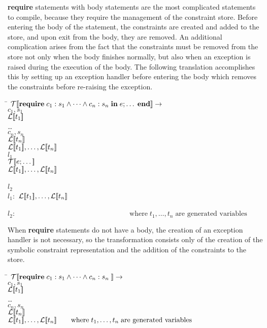 %
{\bf require} statements with body statements are the most complicated
statements to compile, because they require the management of the
constraint store.  Before entering the body of the statement, the
constraints are created and added to the store, and upon exit from the
body, they are removed.  An additional complication arises from the
fact that the constraints must be removed from the store not only when
the body finishes normally, but also when an exception is raised
during the execution of the body.  The following translation
accomplishes this by setting up an exception handler before entering
the body which removes the constraints before re-raising the
exception.

\begin{tabbing}
\qquad \= \quad \kill
${\mathcal{T}{\normalfont [\![} \text{\bf require}\; c_1:s_1\wedge\dots\wedge c_n:s_n\;\text{\bf in}\; e;\dots\;\text{\bf end} {\normalfont ]\!]}} \rightarrow$\\
 $c_1, s_1$\\
 $\mathcal{L}{\normalfont [\![} t_1{\normalfont ]\!]}$\\
\>\dots\\
 $c_n, s_n$\\
 $\mathcal{L}{\normalfont [\![} t_n{\normalfont ]\!]}$\\
 $\mathcal{L}{\normalfont [\![} t_1{\normalfont ]\!]},\dots,\mathcal{L}{\normalfont [\![} t_n{\normalfont ]\!]}$\\
 $l_1$\\
\>${\mathcal{T}{\normalfont [\![} e;\dots {\normalfont ]\!]}}$\\
 $\mathcal{L}{\normalfont [\![} t_1{\normalfont ]\!]},\dots,\mathcal{L}{\normalfont [\![} t_n{\normalfont ]\!]}$\\
\\
 $l_2$\\
$l_1:$ $\mathcal{L}{\normalfont [\![} t_1{\normalfont ]\!]},\dots,\mathcal{L}{\normalfont [\![} t_n{\normalfont ]\!]}$\\
\\
$l_2:\qquad\qquad\qquad\qquad\qquad\qquad\qquad\qquad \text{where}\; t_1,\dots,t_n\;\text{are generated variables}$\>
\end{tabbing}
%
When {\bf require} statements do not have a body, the creation of an
exception handler is not necessary, so the transformation consists
only of the creation of the symbolic constraint representation and the
addition of the constraints to the store.
%
\begin{tabbing}
\qquad \= \quad \kill
${\mathcal{T}{\normalfont [\![} \text{\bf require}\; c_1:s_1\wedge\dots\wedge c_n:s_n\; {\normalfont ]\!]}} \rightarrow$\\
 $c_1, s_1$\\
 $\mathcal{L}{\normalfont [\![} t_1{\normalfont ]\!]}$\\
\>\dots\\
 $c_n, s_n$\\
 $\mathcal{L}{\normalfont [\![} t_n{\normalfont ]\!]}$\\
 $\mathcal{L}{\normalfont [\![} t_1{\normalfont ]\!]},\dots,\mathcal{L}{\normalfont [\![} t_n{\normalfont ]\!]}\qquad \text{where}\; t_1,\dots,t_n\;\text{are generated variables}$
\end{tabbing}

